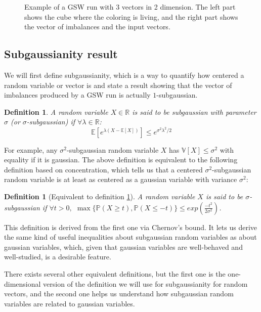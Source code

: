 \documentclass[12pt]{article}
\newtheorem{definition}[theorem]{Definition}
\begin{document}
\begin{figure}
\centering
\newpage
{}
\caption{Example of a GSW run with 3 vectors in 2 dimension. The left part shows the cube where the coloring is living, and the right part shows the vector of imbalances and the input vectors.}
\label{3d_example}

\end{figure}


\subsection{Subgaussianity result}\label{results}
We will first define subgaussianity, which is a way to quantify how centered a random variable or vector is and state a result showing that the vector of imbalances produced by a GSW run is actually $1$-subgaussian.
\begin{definition}\label{def_subgaussianity}
A random variable $X \in \mathbb{R}$ is said to be subgaussian with parameter $\sigma$ (or $\sigma$-subgaussian) if $\forall\lambda\in\mathbb{R}$:
$$\mathbb{E}\left[e^{\lambda(X-\mathbb{E}[X])}\right]\leq e^{\sigma^2\lambda^2/2}$$
\end{definition}
For example, any $\sigma^2$-subgaussian random variable $X$ has $\mathbb{V}[X]\leq\sigma^2$ with equality if it is gaussian. The above definition is equivalent to the following definition based on concentration, which tells us that a centered $\sigma^2$-subgaussian random variable is at least as centered as a gaussian variable with variance $\sigma^2$:
\begin{definition}[Equivalent to definition \ref{def_subgaussianity}]
A random variable $X$ is said to be $\sigma$-subgaussian if $\forall t>0,$ $\max\{\mathbb{P}(X\geq t),\mathbb{P}(X\leq -t)\}\leq exp\left(\frac{-t^2}{2\sigma^2}\right)$.
\end{definition}
This definition is derived from the first one via Chernov's bound. It lets us derive the same kind of useful inequalities about subgaussian random variables as about gaussian variables, which, given that gaussian variables are well-behaved and well-studied, is a desirable feature.

There exists several other equivalent definitions, but the first one is the one-dimensional version of the definition we will use for subgaussianity for random vectors, and the second one helps us understand how subgaussian random variables are related to gaussian variables. 
\end{document}
